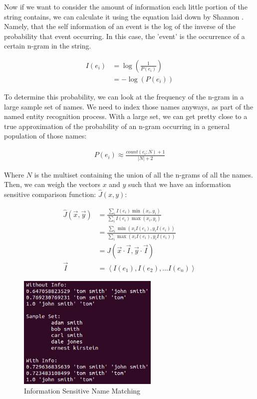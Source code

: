 \documentclass[11pt]{article}
\begin{document}
Now if we want to consider the amount of information each little
portion of the string contains, we can calculate it
using the equation laid down by Shannon \cite{shannon}.
Namely, that the self information of an event is the log of the
inverse of the probability that event occurring. In this case,
the 'event' is the occurrence of a certain n-gram in the string.

\begin{align*}
I(e_i) &= \log\left(\frac{1}{P(e_i)}\right)\\
&= -\log(P(e_i))
\end{align*}

To determine this probability, we can look at the frequency
of the n-gram in a large sample set of names.
We need to index those names anyways, as part of the named entity
recognition process. With a large set, we can get pretty close to a true 
approximation of the probability of an n-gram occurring in 
a general population of those names:

\begin{align*}
P(e_i) \approx \frac{count(e_i; N)+1}{|N|+2}
\end{align*}

Where $N$ is the multiset containing the union of all the n-grams of
all the names. 
Then, we can weigh the vectors $x$ and $y$ such that we have
an information sensitive comparison function: $\hat{J}(x,y)$:

\begin{align*}
\hat{J}(\vec{x},\vec{y}) 
&= \frac{
    \sum_i I(e_i)\min(x_i, y_i)
}{
    \sum_i I(e_i)\max(x_i, y_i)
}\\
&= \frac{
    \sum_i \min(x_iI(e_i), y_iI(e_i))
}{
    \sum_i \max(x_iI(e_i), y_iI(e_i))
}\\
&= J\left(\vec{x} \cdot \vec{I}, \vec{y} \cdot \vec{I} \right)\\
\vec{I} &= \left< I(e_1), I(e_2), ... I(e_n) \right>
\end{align*}

\begin{figure}[h!]
    \centering
    \includegraphics[width=0.6\textwidth,natwidth=1,natheight=1]{imgs/info_comp.png}
    \caption{Information Sensitive Name Matching}
    \label{fig:lev_comp}
\end{figure}
\end{document}
